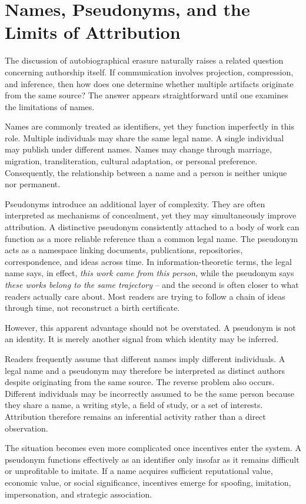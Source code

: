 \documentclass[11pt]{article}
\theoremstyle{plain}
\begin{document}
\section{Names, Pseudonyms, and the Limits of Attribution}

The discussion of autobiographical erasure naturally raises a related question concerning authorship itself. If communication involves projection, compression, and inference, then how does one determine whether multiple artifacts originate from the same source? The answer appears straightforward until one examines the limitations of names.

Names are commonly treated as identifiers, yet they function imperfectly in this role. Multiple individuals may share the same legal name. A single individual may publish under different names. Names may change through marriage, migration, transliteration, cultural adaptation, or personal preference. Consequently, the relationship between a name and a person is neither unique nor permanent.

Pseudonyms introduce an additional layer of complexity. They are often interpreted as mechanisms of concealment, yet they may simultaneously improve attribution. A distinctive pseudonym consistently attached to a body of work can function as a more reliable reference than a common legal name. The pseudonym acts as a namespace linking documents, publications, repositories, correspondence, and ideas across time. In information-theoretic terms, the legal name says, in effect, \emph{this work came from this person}, while the pseudonym says \emph{these works belong to the same trajectory} -- and the second is often closer to what readers actually care about. Most readers are trying to follow a chain of ideas through time, not reconstruct a birth certificate.

However, this apparent advantage should not be overstated. A pseudonym is not an identity. It is merely another signal from which identity may be inferred.

Readers frequently assume that different names imply different individuals. A legal name and a pseudonym may therefore be interpreted as distinct authors despite originating from the same source. The reverse problem also occurs. Different individuals may be incorrectly assumed to be the same person because they share a name, a writing style, a field of study, or a set of interests. Attribution therefore remains an inferential activity rather than a direct observation.

The situation becomes even more complicated once incentives enter the system. A pseudonym functions effectively as an identifier only insofar as it remains difficult or unprofitable to imitate. If a name acquires sufficient reputational value, economic value, or social significance, incentives emerge for spoofing, imitation, impersonation, and strategic association.
\end{document}
